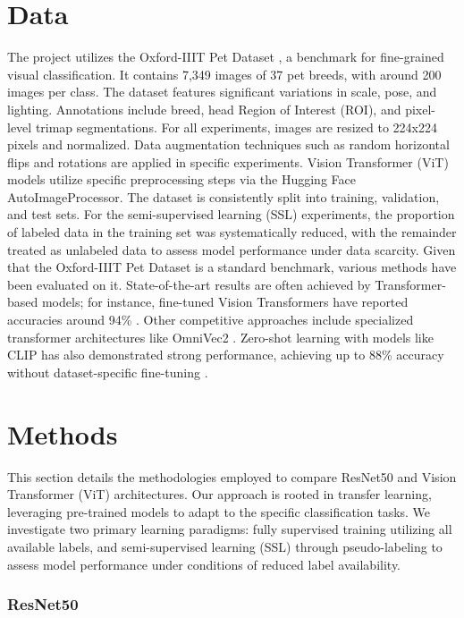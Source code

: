 \documentclass{article}
\begin{document}
\section{Data}
The project utilizes the Oxford-IIIT Pet Dataset \cite{Parkhi2012}, a benchmark for fine-grained visual classification. It contains 7,349 images of 37 pet breeds, with around 200 images per class. The dataset features significant variations in scale, pose, and lighting. Annotations include breed, head Region of Interest (ROI), and pixel-level trimap segmentations. For all experiments, images are resized to 224x224 pixels and normalized. Data augmentation techniques such as random horizontal flips and rotations are applied in specific experiments. Vision Transformer (ViT) models utilize specific preprocessing steps via the Hugging Face AutoImageProcessor. The dataset is consistently split into training, validation, and test sets. For the semi-supervised learning (SSL) experiments, the proportion of labeled data in the training set was systematically reduced, with the remainder treated as unlabeled data to assess model performance under data scarcity. Given that the Oxford-IIIT Pet Dataset is a standard benchmark, various methods have been evaluated on it. State-of-the-art results are often achieved by Transformer-based models; for instance, fine-tuned Vision Transformers have reported accuracies around 94\% \cite{HFNorburayViTPets}. Other competitive approaches include specialized transformer architectures like OmniVec2 \cite{Srivastava2024OmniVec2}. Zero-shot learning with models like CLIP has also demonstrated strong performance, achieving up to 88\% accuracy without dataset-specific fine-tuning \cite{HFMuellje3ViTPets}.



\section{Methods}
This section details the methodologies employed to compare ResNet50 and Vision Transformer (ViT) architectures. Our approach is rooted in transfer learning, leveraging pre-trained models to adapt to the specific classification tasks. We investigate two primary learning paradigms: fully supervised training utilizing all available labels, and semi-supervised learning (SSL) through pseudo-labeling to assess model performance under conditions of reduced label availability. 


\subsubsection{ResNet50}
\end{document}

